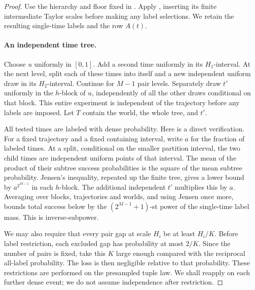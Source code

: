 \begin{proof}
Use the hierarchy and floor fixed in
.
Apply , inserting its finite intermediate
Taylor scales before making any label selections.
We retain the resulting single-time labels and the row \(A(t)\).

\paragraph{An independent time tree.}
Choose \(u\) uniformly in \([0,1]\).
Add a second time uniformly in its \(H_1\)-interval.
At the next level, split each of these times into itself and a new
independent uniform draw in its \(H_2\)-interval.
Continue for \(M-1\) pair levels.
Separately draw \(t'\) uniformly in the \(h\)-block of \(u\), independently
of all the other draws conditional on that block.
This entire experiment is independent of the trajectory before any
labels are imposed.  Let \(T\) contain the world, the whole tree, and
\(t'\).

All tested times are labeled with dense probability.
Here is a direct verification.  For a fixed trajectory and a fixed
containing interval, write \(a\) for the fraction of labeled times.
At a split, conditional on the smaller partition interval, the two
child times are independent uniform points of that interval.
The mean of the product of their subtree success probabilities is
the square of the mean subtree probability.
Jensen's inequality, repeated up the finite tree, gives a lower bound
by \(a^{2^{M-1}}\) in each \(h\)-block.
The additional independent \(t'\) multiplies this by \(a\).
Averaging over blocks, trajectories and worlds, and using Jensen once
more, bounds total success below by the
\((2^{M-1}+1)\)-st power of the single-time label mass.
This is inverse-subpower.

We may also require that every pair gap at scale \(H_i\) be at least
\(H_i/K\).  Before label restriction, each excluded gap has probability
at most \(2/K\).  Since the number of pairs is fixed, take this \(K\)
large enough compared with the reciprocal all-label probability.
The loss is then negligible relative to that probability.
These restrictions are performed on the presampled tuple law.
We shall reapply  on each further dense event;
we do not assume independence after restriction.


\end{proof}
